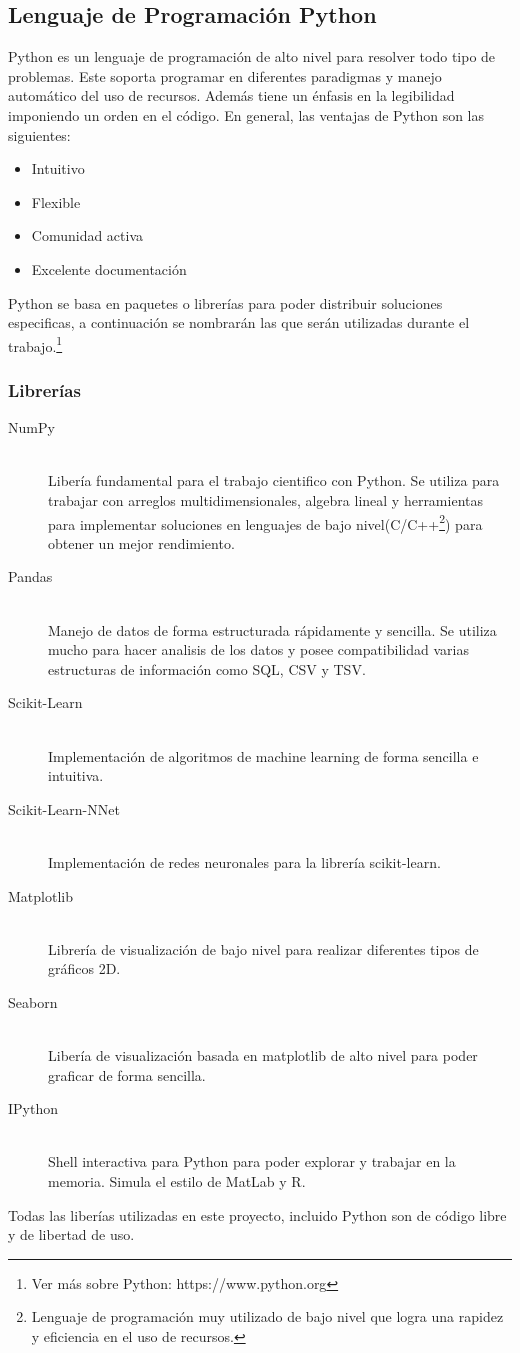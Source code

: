 \subsection{Lenguaje de Programación Python}
Python es un lenguaje de programación de alto nivel para resolver todo tipo de problemas. Este soporta programar en diferentes paradigmas y manejo automático del uso de recursos. Además tiene un énfasis en la legibilidad imponiendo un orden en el código.
En general, las ventajas de Python son las siguientes:\\
\begin{itemize}
  \item Intuitivo
  \item Flexible
  \item Comunidad activa
  \item Excelente documentación
\end{itemize}
Python se basa en paquetes o librerías para poder distribuir soluciones especificas, a continuación se nombrarán las que serán utilizadas durante el trabajo.\footnote{Ver más sobre Python: https://www.python.org}
\subsubsection{Librerías}
\begin{description}
  \item[NumPy] \hfill \\
  Libería fundamental para el trabajo cientifico con Python. Se utiliza para trabajar con arreglos multidimensionales, algebra lineal y herramientas para implementar soluciones en lenguajes de bajo nivel(C/C++\footnote{Lenguaje de programación muy utilizado de bajo nivel que logra una rapidez y eficiencia en el uso de recursos.}) para obtener un mejor rendimiento.
  \item[Pandas] \hfill \\
  Manejo de datos de forma estructurada rápidamente y sencilla. Se utiliza mucho para hacer analisis de los datos y posee compatibilidad varias estructuras de información como SQL, CSV y TSV.
  \item[Scikit-Learn] \cite{scikit-learn} \hfill \\
  Implementación de algoritmos de machine learning de forma sencilla e intuitiva.
  \item[Scikit-Learn-NNet] \hfill \\
  Implementación de redes neuronales para la librería scikit-learn.
  \item[Matplotlib] \hfill \\
  Librería de visualización de bajo nivel para realizar diferentes tipos de gráficos 2D.
  \item[Seaborn] \hfill \\
  Libería de visualización basada en matplotlib de alto nivel para poder graficar de forma sencilla.
  \item[IPython] \hfill \\
  Shell interactiva para Python para poder explorar y trabajar en la memoria. Simula el estilo de MatLab y R.
\end{description}
Todas las liberías utilizadas en este proyecto, incluido Python son de código libre y de libertad de uso.
